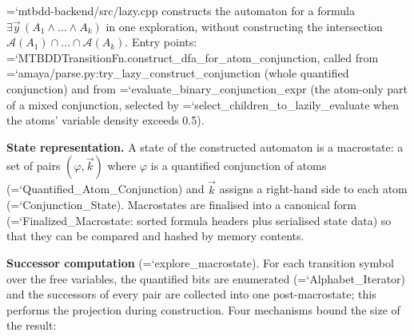 \documentclass[10pt,a4paper]{article}
\newcommand{\code}[1]{{\small\ttfamily\hyphenchar\font=`\-\relax #1}}
\begin{document}
\code{mtbdd-backend/src/lazy.cpp} constructs the automaton for a formula
$\exists \vec{y}\,(A_1 \wedge \dots \wedge A_k)$ in one exploration, without constructing the
intersection $\mathcal{A}(A_1) \cap \dots \cap \mathcal{A}(A_k)$.  Entry points:
\code{MTBDDTransitionFn.\allowbreak construct\_\allowbreak dfa\_\allowbreak for\_\allowbreak atom\_\allowbreak conjunction}, called from
\code{amaya/parse.py:\allowbreak try\_\allowbreak lazy\_\allowbreak construct\_\allowbreak conjunction} (whole quantified conjunction) and from
\code{evaluate\_\allowbreak binary\_\allowbreak conjunction\_\allowbreak expr} (the atom-only part of a mixed conjunction, selected by
\code{select\_\allowbreak children\_\allowbreak to\_\allowbreak lazily\_\allowbreak evaluate} when the atoms' variable density exceeds 0.5).

\textbf{State representation.}  A state of the constructed automaton is a macrostate: a set of pairs
$(\varphi, \vec{k})$ where $\varphi$ is a quantified conjunction of atoms
(\code{Quantified\_Atom\_Conjunction}) and $\vec{k}$ assigns a right-hand side to each atom
(\code{Conjunction\_State}).  Macrostates are finalised into a canonical form
(\code{Finalized\_Macrostate}: sorted formula headers plus serialised state data) so that they can be
compared and hashed by memory contents.

\textbf{Successor computation} (\code{explore\_macrostate}).  For each transition symbol over the free
variables, the quantified bits are enumerated (\code{Alphabet\_Iterator}) and the successors of every
pair are collected into one post-macrostate; this performs the projection during construction.  Four
mechanisms bound the size of the result:
\end{document}
